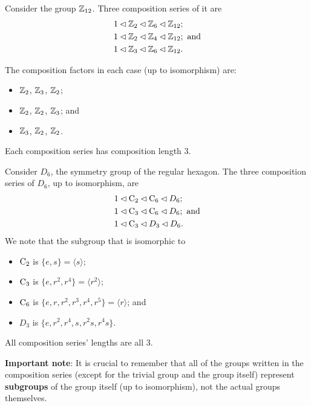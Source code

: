 \begin{example}
    Consider the group $\mathbb{Z}_{12}$. Three composition series of it are
    \begin{align*}
        &1 \lhd \mathbb{Z}_2 \lhd \mathbb{Z}_6 \lhd \mathbb{Z}_{12};\\
        &1 \lhd \mathbb{Z}_2 \lhd \mathbb{Z}_4 \lhd \mathbb{Z}_{12}; \text{ and}\\
        &1 \lhd \mathbb{Z}_3 \lhd \mathbb{Z}_6 \lhd \mathbb{Z}_{12}.
    \end{align*}

    The composition factors in each case (up to isomorphism) are:
    \begin{itemize}
        \item $\mathbb{Z}_2$, $\mathbb{Z}_3$, $\mathbb{Z}_2$;
        \item $\mathbb{Z}_2$, $\mathbb{Z}_2$, $\mathbb{Z}_3$; and
        \item $\mathbb{Z}_3$, $\mathbb{Z}_2$, $\mathbb{Z}_2$.
    \end{itemize}
    Each composition series has composition length 3.
\end{example}

\begin{example}
    Consider $D_6$, the symmetry group of the regular hexagon. The three composition series of $D_6$, up to isomorphism, are
    \begin{align*}
        &1 \lhd \mathrm{C}_{2} \lhd \mathrm{C}_{6} \lhd D_6;\\
        &1 \lhd \mathrm{C}_{3} \lhd \mathrm{C}_{6} \lhd D_6; \text{ and}\\
        &1 \lhd \mathrm{C}_{3} \lhd D_3 \lhd D_6.
    \end{align*}
    We note that the subgroup that is isomorphic to
    \begin{itemize}
        \item $\mathrm{C}_{2}$ is $\{e, s\} = \langle s \rangle$;
        \item $\mathrm{C}_{3}$ is $\{e, r^2, r^4\} = \langle r^2\rangle$;
        \item $\mathrm{C}_{6}$ is $\{e, r, r^2, r^3, r^4, r^5\} = \langle r\rangle$; and
        \item $D_3$ is $\{e, r^2, r^4, s, r^2s, r^4s\}$.
    \end{itemize}
    All composition series' lengths are all 3.
\end{example}
\textbf{Important note}: It is crucial to remember that all of the groups written in the composition series (except for the trivial group and the group itself) represent \textbf{subgroups} of the group itself (up to isomorphism), not the actual groups themselves.

